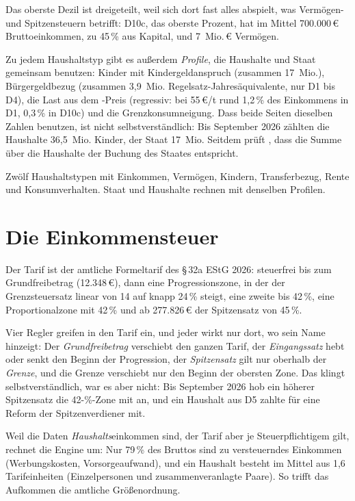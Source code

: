 Das oberste Dezil ist dreigeteilt, weil sich dort fast alles abspielt, was Vermögen- und
Spitzensteuern betrifft: D10c, das oberste Prozent, hat im Mittel 700.000\,\euro{}
Bruttoeinkommen, zu 45\,\% aus Kapital, und 7~Mio.\,\euro{} Vermögen.

Zu jedem Haushaltstyp gibt es außerdem \emph{Profile}, die Haushalte und Staat gemeinsam
benutzen: Kinder mit Kindergeldanspruch (zusammen 17~Mio.), Bürgergeldbezug (zusammen
3,9~Mio. Regelsatz-Jahresäquivalente, nur D1 bis D4), die Last aus dem \COz-Preis
(regressiv: bei 55\,\euro/t rund 1,2\,\% des Einkommens in D1, 0,3\,\% in D10c) und die Grenzkonsumneigung. Dass
beide Seiten dieselben Zahlen benutzen, ist nicht selbstverständlich: Bis September 2026
zählten die Haushalte 36,5~Mio. Kinder, der Staat 17~Mio. Seitdem prüft
, dass die Summe über die Haushalte der Buchung des Staates
entspricht.

\begin{merksatz}
Zwölf Haushaltstypen mit Einkommen, Vermögen, Kindern, Transferbezug, Rente und
Konsumverhalten. Staat und Haushalte rechnen mit denselben Profilen.
\end{merksatz}

\section{Die Einkommensteuer}

Der Tarif ist der amtliche Formeltarif des §\,32a EStG 2026: steuerfrei bis zum
Grundfreibetrag (12.348\,\euro{}), dann eine Progressionszone, in der der Grenzsteuersatz
linear von 14 auf knapp 24\,\% steigt, eine zweite bis 42\,\%, eine Proportionalzone mit 42\,\%
und ab 277.826\,\euro{} der Spitzensatz von 45\,\%.

Vier Regler greifen in den Tarif ein, und jeder wirkt nur dort, wo sein Name hinzeigt: Der
\emph{Grundfreibetrag} verschiebt den ganzen Tarif, der \emph{Eingangssatz} hebt oder senkt den
Beginn der Progression, der \emph{Spitzensatz} gilt nur oberhalb der \emph{Grenze}, und die
Grenze verschiebt nur den Beginn der obersten Zone. Das klingt selbstverständlich, war es
aber nicht: Bis September 2026 hob ein höherer Spitzensatz die 42-\%-Zone mit an, und ein
Haushalt aus D5 zahlte für eine Reform der Spitzenverdiener mit.

Weil die Daten \emph{Haushalts}einkommen sind, der Tarif aber je Steuerpflichtigem gilt,
rechnet die Engine um: Nur 79\,\% des Bruttos sind zu versteuerndes Einkommen (Werbungskosten,
Vorsorgeaufwand), und ein Haushalt besteht im Mittel aus 1,6 Tarifeinheiten (Einzelpersonen
und zusammenveranlagte Paare). So trifft das Aufkommen die amtliche Größenordnung.

